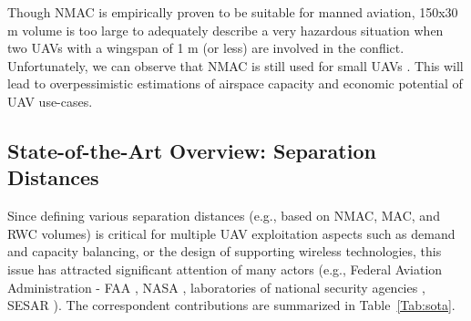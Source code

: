 \documentclass[10pt,conference]{IEEEtran}
\begin{document}
Though NMAC is empirically proven to be suitable for manned aviation, 150x30 m volume is too large to adequately describe a very hazardous situation when two UAVs with a wingspan of 1 m (or less) are involved in the conflict. Unfortunately, we can observe that NMAC is still used for small UAVs \cite{Assure,Weinert16,Cook15,Weinert18}. 
This will lead to overpessimistic estimations of airspace capacity and economic potential of UAV use-cases.



\subsection{State-of-the-Art Overview: Separation Distances}
Since defining various separation distances (e.g., based on NMAC, MAC, and RWC volumes) is critical for multiple UAV exploitation aspects such as demand and capacity balancing, or the design of supporting wireless technologies, this issue has attracted significant attention of many actors (e.g., Federal Aviation Administration - FAA \cite{Assure,Cook15}, NASA \cite{Cook15}, laboratories of national security agencies \cite{Weinert16,Weinert18,Weinert22}, SESAR \cite{Bubbles21}). 
The correspondent contributions are summarized in Table~\ref{Tab:sota}. 
\end{document}
